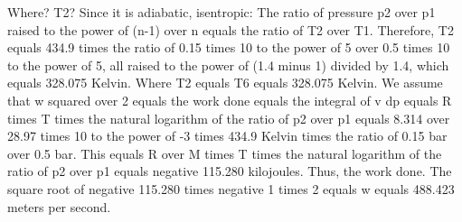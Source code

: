 Where? T2?
Since it is adiabatic, isentropic:
The ratio of pressure p2 over p1 raised to the power of (n-1) over n equals the ratio of T2 over T1. Therefore, T2 equals 434.9 times the ratio of 0.15 times 10 to the power of 5 over 0.5 times 10 to the power of 5, all raised to the power of (1.4 minus 1) divided by 1.4, which equals 328.075 Kelvin.
Where T2 equals T6 equals 328.075 Kelvin.
We assume that w squared over 2 equals the work done equals the integral of v dp equals R times T times the natural logarithm of the ratio of p2 over p1 equals 8.314 over 28.97 times 10 to the power of -3 times 434.9 Kelvin times the ratio of 0.15 bar over 0.5 bar.
This equals R over M times T times the natural logarithm of the ratio of p2 over p1 equals negative 115.280 kilojoules.
Thus, the work done.
The square root of negative 115.280 times negative 1 times 2 equals w equals 488.423 meters per second.